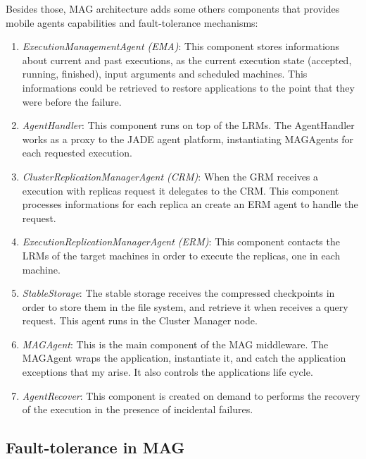 \documentclass[times, 10pt, twocolumn]{article}
\begin{document}
Besides those, MAG architecture adds some others components that provides
mobile agents capabilities and fault-tolerance mechanisms:

\begin{enumerate}

    \item \emph{ExecutionManagementAgent (EMA)}: This component stores
    informations about current and past executions, as the current execution state
    (accepted, running, finished), input arguments and scheduled machines. This informations
    could be retrieved to restore applications to the point that they were before
    the failure.

    \item \emph{AgentHandler}: This component runs on top of the LRMs. The
    AgentHandler works as a proxy to the JADE agent platform, instantiating
    MAGAgents for each requested execution.

    \item \emph{ClusterReplicationManagerAgent (CRM)}: When the GRM receives a
    execution with replicas request it delegates to the CRM. This component
    processes informations for each replica an create an ERM agent to handle the
    request.

    \item \emph{ExecutionReplicationManagerAgent (ERM)}: This component
    contacts the LRMs of the target machines in order to execute the replicas, one
    in each machine.

    \item \emph{StableStorage}: The stable storage receives the compressed
    checkpoints in order to store them in the file system, and retrieve it when
    receives a query request. This agent runs in the Cluster Manager node.

    \item \emph{MAGAgent}: This is the main component of the MAG middleware.
    The MAGAgent wraps the application, instantiate it, and catch the application
    exceptions that my arise. It also controls the applications life cycle.

    \item \emph{AgentRecover}: This component is created on demand to performs
    the recovery of the execution in the presence of incidental failures.

\end{enumerate}

\subsection{Fault-tolerance in MAG\label{sec:faulttolerance}}
\end{document}

